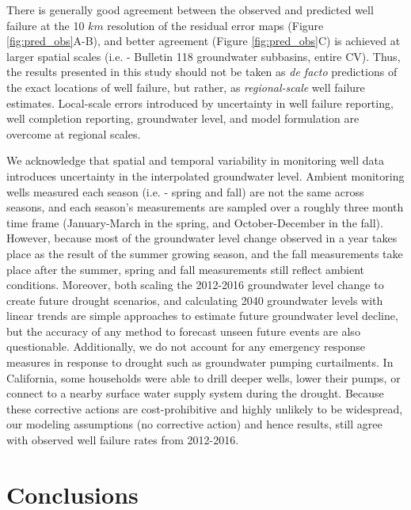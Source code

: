 There is generally good agreement between the observed and predicted well failure at the 10 $km$ resolution of the residual error maps (Figure \ref{fig:pred_obs}A-B), and better agreement (Figure \ref{fig:pred_obs}C) is achieved at larger spatial scales (i.e. - Bulletin 118 groundwater subbasins, entire CV). Thus, the results presented in this study should not be taken as \textit{de facto} predictions of the exact locations of well failure, but rather, as \textit{regional-scale} well failure estimates. Local-scale errors introduced by uncertainty in well failure reporting, well completion reporting, groundwater level, and model formulation are overcome at regional scales. 

We acknowledge that spatial and temporal variability in monitoring well data introduces uncertainty in the interpolated groundwater level. Ambient monitoring wells measured each season (i.e. - spring and fall) are not the same across seasons, and each season's measurements are sampled over a roughly three month time frame (January-March in the spring, and October-December in the fall). However, because most of the groundwater level change observed in a year takes place as the result of the summer growing season, and the fall measurements take place after the summer, spring and fall measurements still reflect ambient conditions. Moreover, both scaling the 2012-2016 groundwater level change to create future drought scenarios, and calculating 2040 groundwater levels with linear trends are simple approaches to estimate future groundwater level decline, but the accuracy of any method to forecast unseen future events are also questionable. Additionally, we do not account for any emergency response measures in response to drought such as groundwater pumping curtailments. In California, some households were able to drill deeper wells, lower their pumps, or connect to a nearby surface water supply system during the drought. Because these corrective actions are cost-prohibitive and highly unlikely to be widespread, our modeling assumptions (no corrective action) and hence results, still agree with observed well failure rates from 2012-2016. 




\section{Conclusions}

